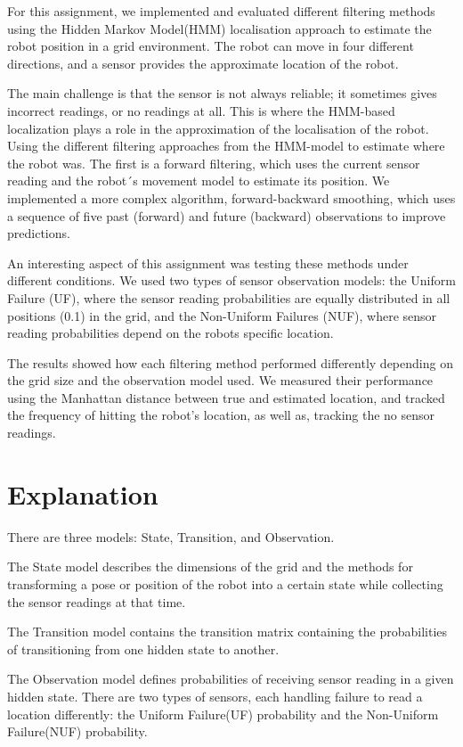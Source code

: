 \documentclass{article}
\begin{document}
For this assignment, we implemented and evaluated different filtering methods using the Hidden Markov Model(HMM) localisation approach to estimate the robot position in a grid environment. The robot can move in four different directions, and a sensor provides the approximate location of the robot.

The main challenge is that the sensor is not always reliable; it sometimes gives incorrect readings, or no readings at all. This is where the HMM-based localization plays a role in the approximation of the localisation of the robot. Using the different filtering approaches from the HMM-model to estimate where the robot was. 
The first is a forward filtering, which uses the current sensor reading and the robot´s movement model to estimate its position. We implemented a more complex algorithm, forward-backward smoothing, which uses a sequence of five past (forward) and future (backward) observations to improve predictions.

An interesting aspect of this assignment was testing these methods under different conditions. We used two types of sensor observation models: the Uniform Failure (UF), where the sensor reading probabilities are equally distributed in all positions (0.1) in the grid, and the Non-Uniform Failures (NUF), where sensor reading probabilities depend on the robots specific location. 

The results showed how each filtering method performed differently depending on the grid size and the observation model used. We measured their performance using the Manhattan distance between true and estimated location, and tracked the frequency of hitting the robot's location, as well as, tracking the no sensor readings. 


\section*{Explanation}
\indent

There are three models: State, Transition, and Observation. 

The State model describes the dimensions of the grid and the methods for transforming a pose or position of the robot into a certain state while collecting the sensor readings at that time. 

The Transition model contains the transition matrix containing the probabilities of transitioning from one hidden state to another. 

The Observation model defines probabilities of receiving sensor reading in a given hidden state. There are two types of sensors, each handling failure to read a location differently: the Uniform Failure(UF) probability and the Non-Uniform Failure(NUF) probability. 
\end{document}
